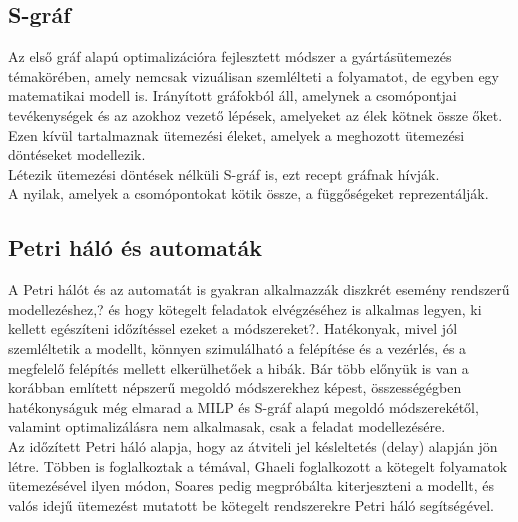 \documentclass [12pt]{report}
\begin{document}
 \subsection{S-gráf}
   Az első gráf alapú optimalizációra fejlesztett módszer a gyártásütemezés témakörében, amely nemcsak vizuálisan szemlélteti a folyamatot, de egyben egy matematikai modell is. Irányított gráfokból áll, amelynek a csomópontjai tevékenységek és az azokhoz vezető lépések, amelyeket az élek kötnek össze őket. Ezen kívül tartalmaznak ütemezési éleket, amelyek a meghozott ütemezési döntéseket modellezik.\\
   Létezik ütemezési döntések nélküli S-gráf is, ezt recept gráfnak hívják. \\
   A nyilak,  amelyek a csomópontokat kötik össze, a függőségeket reprezentálják.\cite{Smidla2010} \cite{Hegyhati2009}

\subsection{Petri háló és automaták}
A Petri hálót és az automatát is gyakran alkalmazzák diszkrét esemény rendszerű modellezéshez,? és hogy kötegelt feladatok elvégzéséhez is alkalmas legyen, ki kellett egészíteni  időzítéssel ezeket a módszereket?. Hatékonyak, mivel jól szemléltetik a modellt, könnyen szimulálható a felépítése és a vezérlés, és a megfelelő felépítés mellett elkerülhetőek a hibák. Bár több előnyük is van a korábban említett népszerű megoldó módszerekhez képest, összességégben hatékonyságuk még elmarad a MILP és S-gráf alapú megoldó módszerekétől, valamint optimalizálásra nem alkalmasak, csak a feladat modellezésére. \\
Az időzített Petri háló alapja, hogy az átviteli jel késleltetés (delay) alapján jön létre. Többen is foglalkoztak a témával, Ghaeli foglalkozott a kötegelt folyamatok ütemezésével ilyen módon, Soares pedig megpróbálta kiterjeszteni a modellt, és valós idejű ütemezést mutatott be kötegelt rendszerekre Petri háló segítségével. 
\end{document}
